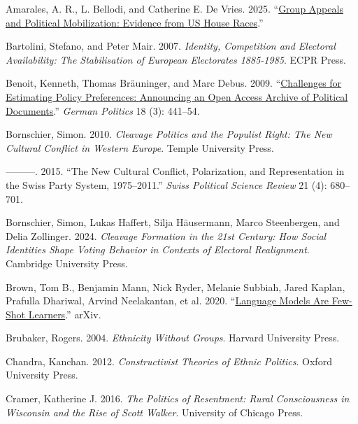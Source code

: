 \documentclass[12pt]{article}
\begin{document}
\label{refs}
\begin{CSLReferences}{1}{0}
Amarales, A. R., L. Bellodi, and Catherine E. De Vries. 2025. {``\href{https://lucabellodi.com/material/group_appeals_mobilization_US.pdf}{Group Appeals and Political Mobilization: Evidence from {US} House Races}.''}

Bartolini, Stefano, and Peter Mair. 2007. \emph{Identity, Competition and Electoral Availability: The Stabilisation of European Electorates 1885-1985}. ECPR Press.

Benoit, Kenneth, Thomas Bräuninger, and Marc Debus. 2009. {``\href{https://doi.org/10.1080/09644000903055856}{Challenges for Estimating Policy Preferences: Announcing an Open Access Archive of Political Documents}.''} \emph{German Politics} 18 (3): 441--54.

Bornschier, Simon. 2010. \emph{Cleavage Politics and the Populist Right: The New Cultural Conflict in Western Europe}. Temple University Press.

---------. 2015. {``The New Cultural Conflict, Polarization, and Representation in the Swiss Party System, 1975--2011.''} \emph{Swiss Political Science Review} 21 (4): 680--701.

Bornschier, Simon, Lukas Haffert, Silja Häusermann, Marco Steenbergen, and Delia Zollinger. 2024. \emph{Cleavage Formation in the 21st Century: How Social Identities Shape Voting Behavior in Contexts of Electoral Realignment}. Cambridge University Press.

Brown, Tom B., Benjamin Mann, Nick Ryder, Melanie Subbiah, Jared Kaplan, Prafulla Dhariwal, Arvind Neelakantan, et al. 2020. {``\href{https://doi.org/10.48550/arXiv.2005.14165}{Language Models Are Few-Shot Learners}.''} {arXiv}.

Brubaker, Rogers. 2004. \emph{Ethnicity Without Groups}. Harvard University Press.

Chandra, Kanchan. 2012. \emph{Constructivist Theories of Ethnic Politics}. Oxford University Press.

Cramer, Katherine J. 2016. \emph{The Politics of Resentment: Rural Consciousness in Wisconsin and the Rise of Scott Walker}. University of Chicago Press.


\end{CSLReferences}
\end{document}
